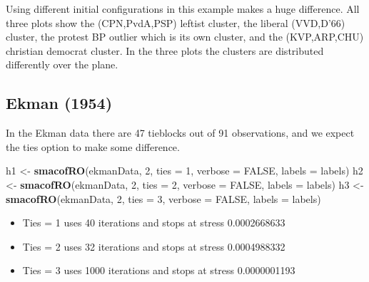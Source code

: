\documentclass[
  12pt,
]{article}
\newenvironment{Shaded}{\begin{snugshade}}{\end{snugshade}}
\newcommand{\AttributeTok}[1]{\textcolor[rgb]{0.13,0.29,0.53}{#1}}
\newcommand{\ConstantTok}[1]{\textcolor[rgb]{0.56,0.35,0.01}{#1}}
\newcommand{\DecValTok}[1]{\textcolor[rgb]{0.00,0.00,0.81}{#1}}
\newcommand{\FunctionTok}[1]{\textcolor[rgb]{0.13,0.29,0.53}{\textbf{#1}}}
\newcommand{\NormalTok}[1]{#1}
\newcommand{\OtherTok}[1]{\textcolor[rgb]{0.56,0.35,0.01}{#1}}
\providecommand{\tightlist}{%
  \setlength{\itemsep}{0pt}\setlength{\parskip}{0pt}}
\begin{document}
Using different initial configurations in this example makes a huge difference. All three plots
show the (CPN,PvdA,PSP) leftist cluster, the liberal (VVD,D'66) cluster, the protest BP outlier which is its own cluster, and the (KVP,ARP,CHU) christian democrat cluster. In the three plots the
clusters are distributed differently over the plane.

\subsection{Ekman (1954)}\label{ekman_54}

In the Ekman data there are 47 tieblocks out of
91 observations, and we expect the
ties option to make some difference.

\begin{Shaded}
\begin{Highlighting}[]
\NormalTok{h1 }\OtherTok{\textless{}{-}} \FunctionTok{smacofRO}\NormalTok{(ekmanData, }\DecValTok{2}\NormalTok{, }\AttributeTok{ties =} \DecValTok{1}\NormalTok{, }\AttributeTok{verbose =} \ConstantTok{FALSE}\NormalTok{, }\AttributeTok{labels =}\NormalTok{ labels)}
\NormalTok{h2 }\OtherTok{\textless{}{-}} \FunctionTok{smacofRO}\NormalTok{(ekmanData, }\DecValTok{2}\NormalTok{, }\AttributeTok{ties =} \DecValTok{2}\NormalTok{, }\AttributeTok{verbose =} \ConstantTok{FALSE}\NormalTok{, }\AttributeTok{labels =}\NormalTok{ labels)}
\NormalTok{h3 }\OtherTok{\textless{}{-}} \FunctionTok{smacofRO}\NormalTok{(ekmanData, }\DecValTok{2}\NormalTok{, }\AttributeTok{ties =} \DecValTok{3}\NormalTok{, }\AttributeTok{verbose =} \ConstantTok{FALSE}\NormalTok{, }\AttributeTok{labels =}\NormalTok{ labels)}
\end{Highlighting}
\end{Shaded}

\begin{itemize}
\tightlist
\item
  Ties = 1 uses 40 iterations and stops at stress 0.0002668633
\item
  Ties = 2 uses 32 iterations and stops at stress 0.0004988332
\item
  Ties = 3 uses 1000 iterations and stops at stress 0.0000001193
\end{itemize}
\end{document}

